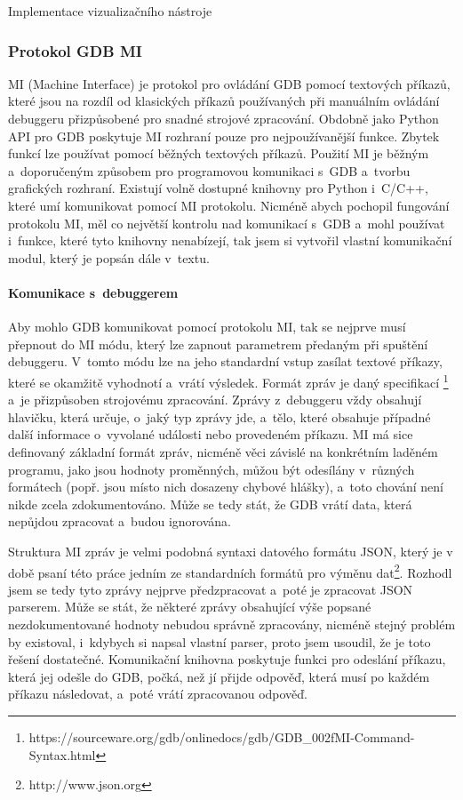 \documentclass[czech,bachelor,male,python,dept460,hidelinks]{diploma}						%
\newcommand{\parspace}[1][]{
	\ifthenelse{\isempty{#1}}{\vspace{0mm}}{\vspace{#1}}
	\par
}
\begin{document}
\begin{section}{Implementace vizualizačního nástroje}
		\subsubsection{Protokol GDB MI}
		MI (Machine Interface) je protokol pro ovládání GDB pomocí textových příkazů, které jsou na rozdíl od klasických příkazů používaných při manuálním
		ovládání debuggeru přizpůsobené pro snadné strojové zpracování. Obdobně jako Python API pro GDB poskytuje MI rozhraní pouze pro nejpoužívanější funkce.
		Zbytek funkcí lze používat pomocí běžných textových příkazů. Použití MI je běžným a~doporučeným \cite{gdb-mi-usage} způsobem pro programovou komunikaci
		s~GDB a~tvorbu grafických rozhraní. Existují volně dostupné knihovny pro Python i~C/C++, které umí komunikovat pomocí MI protokolu.
		Nicméně abych pochopil fungování protokolu MI, měl co největší kontrolu nad komunikací s~GDB a~mohl používat i~funkce, které tyto knihovny nenabízejí, tak
		jsem si vytvořil vlastní komunikační modul, který je popsán dále v~textu.
		
		\paragraph*{Komunikace s~debuggerem}
			Aby mohlo GDB komunikovat pomocí protokolu MI, tak se nejprve musí přepnout do MI módu, který lze zapnout parametrem předaným při spuštění debuggeru.
			V~tomto módu lze na jeho standardní vstup zasílat textové příkazy, které se okamžitě vyhodnotí a~vrátí výsledek. Formát zpráv je daný specifikací
			\footnote{https://sourceware.org/gdb/onlinedocs/gdb/GDB\_002fMI-Command-Syntax.html} a~je přizpůsoben strojovému zpracování. Zprávy z~debuggeru
			vždy obsahují hlavičku, která určuje, o~jaký typ zprávy jde, a~tělo, které obsahuje případné další informace o~vyvolané události nebo
			provedeném příkazu. MI má sice definovaný základní formát zpráv, nicméně věci závislé na konkrétním laděném programu, jako jsou hodnoty proměnných,
			můžou být odesílány v~různých formátech (popř. jsou místo nich dosazeny chybové hlášky), a~toto chování není nikde zcela zdokumentováno.
			Může se tedy stát, že GDB vrátí data, která nepůjdou zpracovat a~budou ignorována.
			
			\parspace Struktura MI zpráv je velmi podobná syntaxi datového formátu JSON, který je v době psaní této práce jedním ze standardních formátů pro výměnu
			dat\footnote{http://www.json.org}.
			Rozhodl jsem se tedy tyto zprávy nejprve předzpracovat a~poté je zpracovat JSON parserem. Může se stát, že některé zprávy obsahující výše popsané 
			nezdokumentované hodnoty nebudou správně zpracovány, nicméně stejný problém by existoval, i~kdybych si napsal vlastní parser, proto jsem usoudil, že je
			toto řešení dostatečné. Komunikační knihovna poskytuje funkci pro odeslání příkazu, která jej odešle do GDB, počká, než jí přijde odpověď, která musí po
			každém příkazu následovat, a~poté vrátí zpracovanou odpověď.
			

\end{section}
\end{document}
